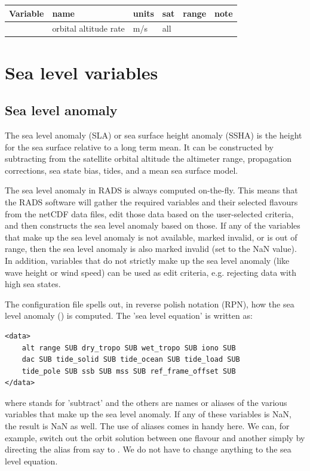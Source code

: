\documentclass[a4paper,11pt,openany,natbib,nomargin]{thesis}
\newenvironment{vartable}{
\begin{table}[ht]
\small
\begin{tabular}{lllllr}
\hline\hline
Variable & name & units & sat & range & note \\
\hline\hline
}{
\hline
\end{tabular}
\end{table}
}
\begin{document}
\begin{vartable}
\var{alt_rate} & orbital altitude rate & m/s & all && \\
\end{vartable}

\chapter{Sea level variables}
\section{Sea level anomaly}
\label{var:sla}
The sea level anomaly (SLA) or sea surface height anomaly (SSHA) is the height for the sea surface relative to a long term mean. It can be constructed by subtracting from the satellite orbital altitude the altimeter range, propagation corrections, sea state bias, tides, and a mean sea surface model.

The sea level anomaly in RADS is always computed on-the-fly. This means that the RADS software will gather the required variables and their selected flavours from the netCDF data files, edit those data based on the user-selected criteria, and then constructs the sea level anomaly based on those. If any of the variables that make up the sea level anomaly is not available, marked invalid, or is out of range, then the sea level anomaly is also marked invalid (set to the NaN value). In addition, variables that do not strictly make up the sea level anomaly (like wave height or wind speed) can be used as edit criteria, e.g. rejecting data with high sea states.

The  configuration file spells out, in reverse polish notation (RPN), how the sea level anomaly () is computed. The 'sea level equation' is written as:

\begin{verbatim}
<data>
    alt range SUB dry_tropo SUB wet_tropo SUB iono SUB
    dac SUB tide_solid SUB tide_ocean SUB tide_load SUB
    tide_pole SUB ssb SUB mss SUB ref_frame_offset SUB
</data>
\end{verbatim}

where  stands for 'subtract' and the others are names or aliases of the various variables that make up the sea level anomaly. If any of these variables is NaN, the result is NaN as well.
The use of aliases comes in handy here. We can, for example, switch out the orbit solution between one flavour
and another simply by directing the alias  from say  to . We do not have to change anything to the sea level equation.
\end{document}

